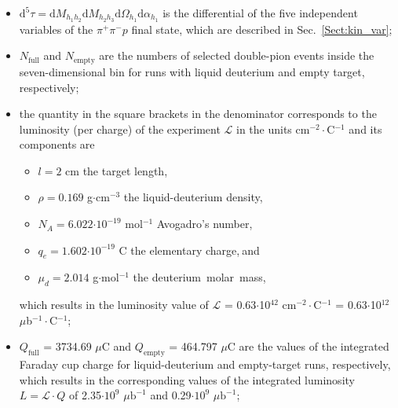 \documentclass[prc,twocolumn,superscriptaddress,showpacs,amssymb,amsmath,amsfonts,aps,nofootinbib]{revtex4-1}
\begin{document}
\begin{itemize}
\item $\textrm{d}^{5}\tau = \textrm{d}M_{h_{1}h_{2}} \textrm{d}M_{h_{2}h_{3}} \textrm{d}\Omega_{h_1} \textrm{d}\alpha_{h_1}$ is the differential of the five independent variables of the $\pi^{+}\pi^{-}p$ final state, which are described in Sec.\!~\ref{Sect:kin_var};\vspace{-0.25em}
\item $N_{\text{full}}$ and $N_{\text{empty}}$ are the numbers of selected double-pion events inside the seven-dimensional bin for runs with liquid deuterium and empty target, respectively;\vspace{-0.25em} 
\item the quantity in the square brackets in the denominator corresponds to the luminosity (per charge) of the experiment $\mathcal{L}$ in the units cm$^{-2}\cdot$C$^{-1}$ and its components are\vspace{-0.25em}
\begin{itemize}
\item[]$\!\!\!\!\!\!\!\!$$l\!=\!2\!$ cm the target length,\vspace{-0.25em}
\item[]$\!\!\!\!\!\!\!\!$$\rho\!=\!0.169$ g$\cdot$cm$^{-3}$ the liquid-deuterium density,\vspace{-0.25em}
\item[ ]$\!\!\!\!\!\!\!\!$$N_{A}\!=\!6.022$$\cdot 10^{-19}$ mol$^{-1}$ Avogadro's number,\vspace{-0.25em}
\item[ ]$\!\!\!\!\!\!\!\!$$q_{e}\!=\!1.602$$\cdot 10^{-19}$ C the elementary charge,$\:$and\vspace{-0.25em}
\item[ ]$\!\!\!\!\!\!\!\!$$\mu_{d}\!=\!2.014$ g$\cdot$mol$^{-1}$ the deuterium~molar~mass,\vspace{-0.25em}
\end{itemize}
which results in the luminosity value of $\mathcal{L}$ = 0.63$\cdot$10$^{42}$ cm$^{-2}\cdot$C$^{-1}$ = 0.63$\cdot$10$^{12}$ $\mu$b$^{-1}\cdot$C$^{-1}$;\vspace{-0.25em}


\item $Q_{\text{full}}$ = 3734.69 $\mu$C and $Q_{\text{empty}}$ = 464.797 $\mu$C are the values of the integrated Faraday cup charge for liquid-deuterium and empty-target runs, respectively, which results in the corresponding values of the integrated luminosity $L=\mathcal{L}\cdot Q$ of 2.35$\cdot 10^{9}$ $\mu \text{b}^{-1}$ and 0.29$\cdot 10^{9}$ $\mu \text{b}^{-1}$; \vspace{-0.25em}


\end{itemize}
\end{document}
